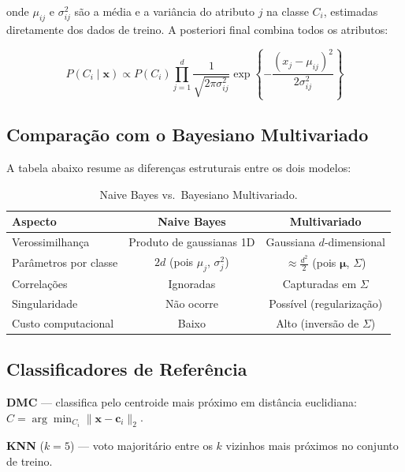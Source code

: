 \documentclass[12pt, a4paper]{article}
\begin{document}
\noindent onde $\mu_{ij}$ e $\sigma_{ij}^2$ são a média e a variância
do atributo $j$ na classe $C_i$, estimadas diretamente dos dados de
treino. A posteriori final combina todos os atributos:

\begin{equation}
    P(C_i \mid \mathbf{x}) \propto
    P(C_i) \prod_{j=1}^{d}
    \frac{1}{\sqrt{2\pi\sigma_{ij}^2}}
    \exp\!\left\{
        -\frac{(x_j - \mu_{ij})^2}{2\sigma_{ij}^2}
    \right\}
\end{equation}

\subsection{Comparação com o Bayesiano Multivariado}

A tabela abaixo resume as diferenças estruturais entre os dois modelos:

\begin{table}[H]
    \centering
    \caption{Naive Bayes vs.\ Bayesiano Multivariado.}
    \begin{tabular}{@{}lcc@{}}
        \toprule
        \textbf{Aspecto} & \textbf{Naive Bayes} & \textbf{Multivariado} \\
        \midrule
        Verossimilhança   & Produto de gaussianas 1D & Gaussiana $d$-dimensional \\
        Parâmetros por classe & $2d$ (pois $\mu_j$, $\sigma^2_j$) & $\approx\frac{d^2}{2}$ (pois $\boldsymbol{\mu}$, $\Sigma$) \\
        Correlações       & Ignoradas & Capturadas em $\Sigma$ \\
        Singularidade     & Não ocorre & Possível (regularização) \\
        Custo computacional & Baixo & Alto (inversão de $\Sigma$) \\
        \bottomrule
    \end{tabular}
\end{table}

\subsection{Classificadores de Referência}

\textbf{DMC} — classifica pelo centroide mais próximo em distância
euclidiana: $\hat{C} = \arg\min_{C_i}\|\mathbf{x}-\boldsymbol{c}_i\|_2$.

\textbf{KNN} ($k=5$) — voto majoritário entre os $k$ vizinhos mais
próximos no conjunto de treino.
\end{document}
